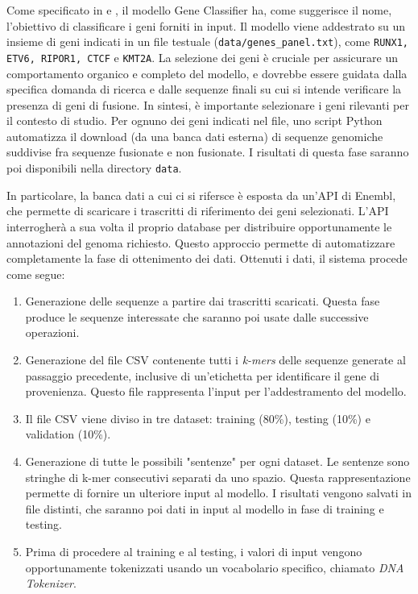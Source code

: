Come specificato in \cite{cirillo} e \cite{desimone}, il modello Gene Classifier ha, come suggerisce il nome, l'obiettivo di classificare i geni forniti in input. Il modello viene addestrato su un insieme di geni  indicati in un file testuale ({\small \verb|data/genes_panel.txt|}), come {\small \verb|RUNX1, ETV6, RIPOR1, CTCF|} e {\small \verb|KMT2A|}. La selezione dei geni è cruciale per assicurare un comportamento organico e completo del modello, e dovrebbe essere guidata dalla specifica domanda di ricerca e dalle sequenze finali su cui si intende verificare la presenza di geni di fusione. In sintesi, è importante selezionare i geni rilevanti per il contesto di studio. Per ognuno dei geni indicati nel file, uno script Python automatizza il download (da una banca dati esterna) di sequenze genomiche suddivise fra sequenze fusionate e non fusionate. I risultati di questa fase saranno poi disponibili nella directory {\small \verb|data|}.

In particolare, la banca dati a cui ci si rifersce è esposta da un'API di Enembl, che permette di scaricare i trascritti di riferimento dei geni selezionati. L'API interrogherà a sua volta il proprio database per distribuire opportunamente le annotazioni del genoma richiesto. Questo approccio permette di automatizzare completamente la fase di ottenimento dei dati. Ottenuti i dati, il sistema procede come segue:

\begin{enumerate}
    \item Generazione delle sequenze a partire dai trascritti scaricati. Questa fase produce le sequenze interessate che saranno poi usate dalle successive operazioni.
    \item Generazione del file CSV contenente tutti i {\em k-mers} delle sequenze generate al passaggio precedente, inclusive di un'etichetta per identificare il gene di provenienza. Questo file rappresenta l'input per l'addestramento del modello.
    \item Il file CSV viene diviso in tre dataset: training (80\%), testing (10\%) e validation (10\%).
    \item Generazione di tutte le possibili "sentenze" per ogni dataset. Le sentenze sono stringhe di k-mer consecutivi separati da uno spazio. Questa rappresentazione permette di fornire un ulteriore input al modello. I risultati vengono salvati in file distinti, che saranno poi dati in input al modello in fase di training e testing.
    \item Prima di procedere al training e al testing, i valori di input vengono opportunamente tokenizzati usando un vocabolario specifico, chiamato {\em DNA Tokenizer}.
\end{enumerate}

